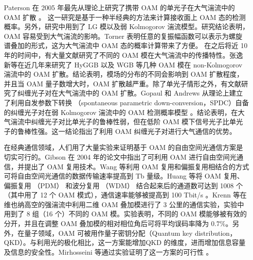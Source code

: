 \documentclass[master]{thesis-uestc}
\begin{document}
Paterson 在 2005 年最先从理论上研究了携带 OAM 的单光子在大气湍流中的 OAM 扩散                                。 这一研究是基于一种半经典的方法来计算接收面上 OAM 态的检测概率。另外，研究中用到了 LG 模以及弱  Kolmogorov 湍流模型。研究结论表明，OAM 容易受到大气湍流的影响。Torner 表明任意的复振幅函数可以表示为螺旋谱叠加的形式，这为大气湍流中 OAM 态的概率计算带来了方便。 在之后将近 10 年的时间中，有大量文献研究了不同的 OAM 模在大气湍流中的传播特性。张逸新等在近几年来研究了 HyGGB 以及 WGB 等几种 OAM 模在 non-Kolmogorov 湍流中的 OAM 扩散。结论表明，模场的分布的不同会影响到 OAM 扩散程度，并且当 OAM 量子数增大时，OAM 扩散越严重。除了单光子情形之外，有文献研究了纠缠光子对在大气湍流中的 OAM 扩散。Gopaul 和 Andrews 从理论上建立了利用自发参数下转换 （spontaneous parametric down-conversion，SPDC）自备的纠缠光子对在弱 Kolmogorov 湍流中的 OAM 检测概率模型 。结论表明，在大气湍流中纠缠光子对比单光子的鲁棒性弱，但在低阶 OAM 模下信号光子比单光子的鲁棒性强。这一结论指出了利用 OAM 纠缠光子对进行大气通信的优势。

在经典通信领域，人们用了大量实验来证明基于 OAM 的自由空间光通信方案是切实可行的。Gibson 在 2004 年的论文中指出了可利用 OAM 进行自由空间光通信，并提出了 OAM 复用技术。Wang 等利用 OAM 复用和偏振复用相结合的方式可将自由空间光通信的数据传输速率提高到 Tb 量级。Huang 等将 OAM 复用、偏振复用 （PDM） 和波分复用 （WDM） 结合起来后的通道数可达到 1008 个（其中用了 12 个 OAM 模式），通信速率能够被提高到 100 Tbit/s 。Krenn 等在维也纳高空的强湍流中利用二维 OAM 叠加模进行了 3 公里的通信实验，实验中用到了 8 组（16 个）不同的 OAM 模。实验表明，不同的 OAM 模能够被有效的分开，并且在调整 OAM 叠加模的相对相位角后可将平均误码率降为 $0.7\%$。另外，在量子领域，OAM 可被用作量子密钥分配（Quantum key distribution，QKD）。与利用光的极化相比，这一方案能增加QKD 的维度，进而增加信息容量及信息的安全性。Mirhosseini 等通过实验证明了这一方案的可行性 。
\end{document}
